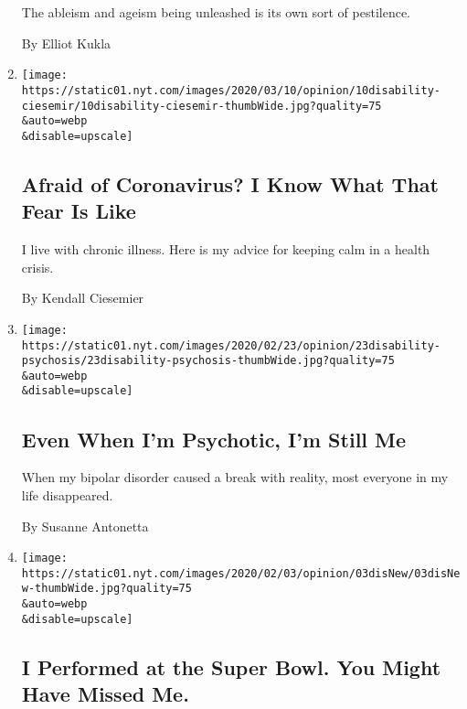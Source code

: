 \begin{enumerate}
  The ableism and ageism being unleashed is its own sort of pestilence.

  By Elliot Kukla
\item
  \href{/2020/03/10/opinion/coronavirus-disability-fear.html}{}

  \texttt{[image: https://static01.nyt.com/images/2020/03/10/opinion/10disability-ciesemir/10disability-ciesemir-thumbWide.jpg?quality=75\\\&auto=webp\\\&disable=upscale]}

  \hypertarget{afraid-of-coronavirus-i-know-what-that-fear-is-like}{%
  \subsection{Afraid of Coronavirus? I Know What That Fear Is
  Like}\label{afraid-of-coronavirus-i-know-what-that-fear-is-like}}

  I live with chronic illness. Here is my advice for keeping calm in a
  health crisis.

  By Kendall Ciesemier
\item
  \href{/2020/02/21/opinion/sunday/bipolar-disorder-psychosis.html}{}

  \texttt{[image: https://static01.nyt.com/images/2020/02/23/opinion/23disability-psychosis/23disability-psychosis-thumbWide.jpg?quality=75\\\&auto=webp\\\&disable=upscale]}

  \hypertarget{even-when-im-psychotic-im-still-me}{%
  \subsection{Even When I'm Psychotic, I'm Still
  Me}\label{even-when-im-psychotic-im-still-me}}

  When my bipolar disorder caused a break with reality, most everyone in
  my life disappeared.

  By Susanne Antonetta
\item
  \href{/2020/02/03/opinion/national-anthem-sign-language.html}{}

  \texttt{[image: https://static01.nyt.com/images/2020/02/03/opinion/03disNew/03disNew-thumbWide.jpg?quality=75\\\&auto=webp\\\&disable=upscale]}

  \hypertarget{i-performed-at-the-super-bowl-you-might-have-missed-me}{%
  \subsection{I Performed at the Super Bowl. You Might Have Missed
  Me.}\label{i-performed-at-the-super-bowl-you-might-have-missed-me}}


\end{enumerate}
